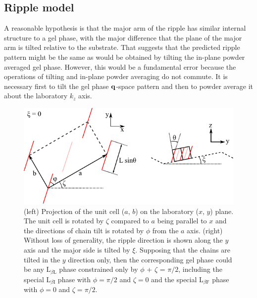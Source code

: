 \subsection{Ripple model}\label{sec:ripple_model}
A reasonable hypothesis is that the major arm of the ripple has similar 
internal structure to a gel phase, with the major   difference that the plane 
of the major arm is tilted relative to the substrate.  That suggests that the 
predicted ripple pattern might be the same as would be obtained by tilting the 
in-plane powder averaged gel phase.  However, this would be a fundamental error 
because the operations of tilting and in-plane powder averaging do not commute.  
It is necessary first to tilt the gel phase $\bold{q}$-space pattern and then to 
powder average it about the laboratory $k_z$ axis.  

\begin{figure}[htbp]
  \centering
  \includegraphics[width=\textwidth]{figures/ripple/thin_rod_model/unit_cell_combined}
  \caption[Thin rod model]{
  (left) Projection of the unit cell ($a$, $b$) on the laboratory ($x$, $y$) plane.  
  The unit cell is rotated by $\zeta$ compared to $a$ being parallel to $x$ and the 
  directions of chain tilt is rotated by $\phi$ from the $a$ axis. 
  (right) Without loss of generality, the ripple direction is shown along 
  the $y$ axis and the major side is tilted by $\xi$.  Supposing that the chains 
  are tilted in the $y$ direction only, then the corresponding gel phase could 
  be any L$_{\beta\text{L}}$ phase constrained only by 
  $\phi$ + $\zeta$ = $\pi/2$, including the 
  special L$_{\beta\text{I}}$ phase with $\phi=\pi/2$ and $\zeta=0$ and the 
  special L$_{\beta\text{F}}$ phase with $\phi=0$ and $\zeta=\pi/2$.}
  \label{fig:thin_rod_model}
\end{figure}

